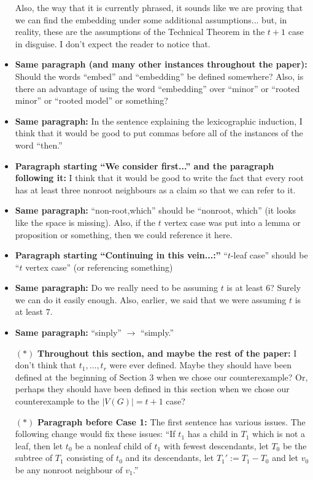 \documentclass[11 pt]{article}
\begin{document}
\begin{itemize}
Also, the way that it is currently phrased, it sounds like we are proving that we can find the embedding under some additional assumptions... but, in reality, these are the assumptions of the Technical Theorem in the $t+1$ case in disguise. I don't expect the reader to notice that.
\item \textbf{Same paragraph (and many other instances throughout the paper):} Should the words ``embed'' and ``embedding'' be defined somewhere? Also, is there an advantage of using the word ``embedding'' over ``minor'' or ``rooted minor'' or ``rooted model'' or something?
\item \textbf{Same paragraph:} In the sentence explaining the lexicographic induction, I think that it would be good to put commas before all of the instances of the word ``then.''
\item \textbf{Paragraph starting ``We consider first...'' and the paragraph following it:} I think that it would be good to write the fact that every root has at least three nonroot neighbours as a claim so that we can refer to it. 
\item \textbf{Same paragraph: } ``non-root,which'' should be ``nonroot, which'' (it looks like the space is missing). Also, if the $t$ vertex case was put into a lemma or proposition or something, then we could reference it here.
\item \textbf{Paragraph starting ``Continuing in this vein...:''} ``$t$-leaf case'' should be ``$t$ vertex case'' (or referencing something)
\item \textbf{Same paragraph:} Do we really need to be assuming $t$ is at least $6$? Surely we can do it easily enough. Also, earlier, we said that we were assuming $t$ is at least $7$. 
\item \textbf{Same paragraph:} ``sinply'' $\to$ ``simply.''
\item[$\boldsymbol{(*)}$] \textbf{Throughout this section, and maybe the rest of the paper:} I don't think that $t_1,\dots,t_r$ were ever defined. Maybe they should have been defined at the beginning of Section 3 when we chose our counterexample? Or, perhaps they should have been defined in this section when we chose our counterexample to the $|V(G)|=t+1$ case?
\item[$\boldsymbol{(*)}$] \textbf{Paragraph before Case 1:} The first sentence has various issues. The following change would fix these issues: ``If $t_1$ has a child in $T_1$ which is not a leaf, then let $t_0$ be a nonleaf child of $t_1$ with fewest descendants, let $T_0$ be the subtree of $T_1$ consisting of $t_0$ and its descendants, let $T_1':=T_1-T_0$ and let $v_0$ be any nonroot neighbour of $v_1$.''

\end{itemize}
\end{document}
